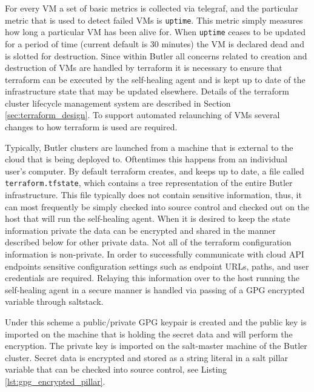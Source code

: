 For every VM a set of basic metrics is collected via telegraf, and the particular metric that is used to detect failed VMs is \texttt{uptime}. This metric simply measures how long a particular VM has been alive for. When \texttt{uptime} ceases to be updated for a period of time (current default is 30 minutes) the VM is declared dead and is slotted for destruction. Since within Butler all concerns related to creation and destruction of VMs are handled by terraform it is necessary to ensure that terraform can be executed by the self-healing agent and is kept up to date of the infrastructure state that may be updated elsewhere. Details of the terraform cluster lifecycle management system are described in Section \ref{sec:terraform_design}. To support automated relaunching of VMs several changes to how terraform is used are required. 

Typically, Butler clusters are launched from a machine that is external to the cloud that is being deployed to. Oftentimes this happens from an individual user's computer. By default terraform creates, and keeps up to date, a file called \texttt{terraform.tfstate}, which contains a tree representation of the entire Butler infrastructure. This file typically does not contain sensitive information, thus, it can most frequently be simply checked into source control and checked out on the host that will run the self-healing agent. When it is desired to keep the state information private the data can be encrypted and shared in the manner described below for other private data. Not all of the terraform configuration information is non-private. In order to successfully communicate with cloud API endpoints sensitive configuration settings such as endpoint URLs, paths, and user credentials are required. Relaying this information over to the host running the self-healing agent in a secure manner is handled via passing of a GPG encrypted variable through saltstack.

Under this scheme a public/private GPG keypair is created and the public key is imported on the machine that is holding the secret data and will perform the encryption. The private key is imported on the salt-master machine of the Butler cluster. Secret data is encrypted and stored as a string literal in a salt pillar variable that can be checked into source control, see Listing \ref{lst:gpg_encrypted_pillar}.


